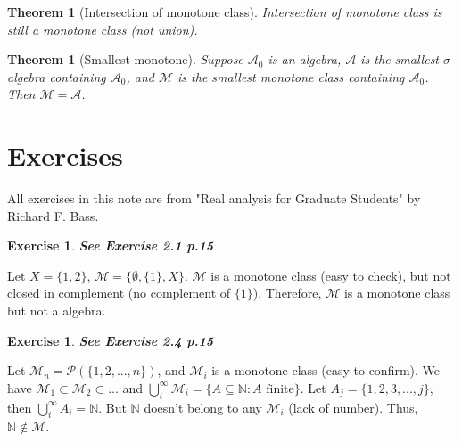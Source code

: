 \documentclass[11pt,a4paper]{article}
\theoremstyle{definition}
\newtheorem{exercise}[definition]{Exercise}
\theoremstyle{plain}
\newtheorem{theorem}[definition]{Theorem}
\newcommand{\N}{\mathbb{N}}
\newcommand{\A}{\mathcal{A}}
\begin{document}
\begin{theorem}[Intersection of monotone class]
Intersection of monotone class is still a monotone class (not union).
\end{theorem}

\begin{theorem}[Smallest monotone]
Suppose $\A_0$ is an algebra, $\A$ is the smallest $\sigma$-algebra containing $\A_0$, and $\mathcal{M}$ is the smallest monotone class containing $\A_0$. Then $\mathcal{M} = \A$.
\end{theorem}

\section{Exercises}

All exercises in this note are from "Real analysis for Graduate Students" by Richard F. Bass.

\begin{exercise}
\textbf{\textit{See Exercise 2.1 p.15}}

Let $X = \{1,2\}$, $\mathcal{M} = \{\emptyset, \{1\}, X\}$. $\mathcal{M}$ is a monotone class (easy to check), but not closed in complement (no complement of $\{1\}$). Therefore, $\mathcal{M}$ is a monotone class but not a algebra.
\end{exercise}

\begin{exercise}
\textbf{\textit{See Exercise 2.4 p.15}}

Let $\mathcal{M}_n = \mathcal{P}(\{1,2,...,n\})$, and $\mathcal{M}_i$ is a monotone class (easy to confirm). We have $\mathcal{M}_1 \subset \mathcal{M}_2\subset ...$ and $\bigcup_i^{\infty}\mathcal{M}_i = \{A\subseteq \N: A \text{ finite}\}$. Let $A_j = \{1,2,3,...,j\}$, then $\bigcup_i^{\infty}A_i = \N$. But $\N$ doesn't belong to any $\mathcal{M}_i$ (lack of number). Thus, $\N \not\in \mathcal{M}$.
\end{exercise}
\end{document}
